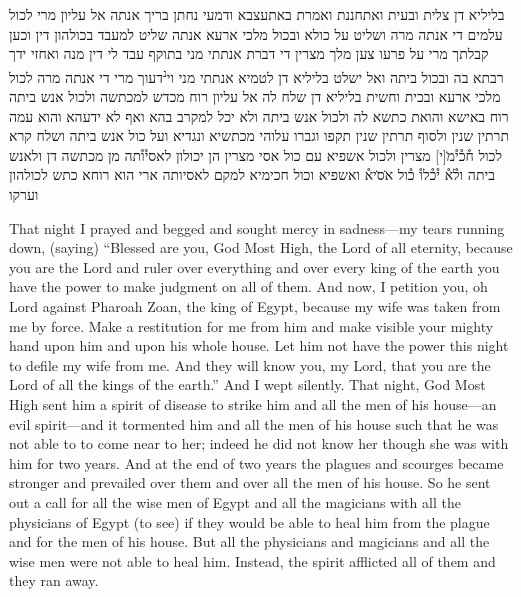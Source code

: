 \begin{aramaictext}
    בליליא דן צלית ובעית ואתחננת ואמרת באתעצבא ודמעי נחתן בריך אנתה
    אל עליון מרי לכול
    עלמים די אנתה מרה ושליט על כולא ובכול מלכי ארעא אנתה שליט
    למעבד בכולהון דין וכען
    קבלתך מרי על פרעו צען מלך מצרין די דברת אנתתי מני בתוקף עבד לי
    דין מנה ואחזי ידך רבתא
    בה ובכול ביתה ואל ישלט בליליא דן לטמיא אנתתי מני וי\textsuperscript{נ}דעוך מרי די
    אנתה מרה לכול מלכי
    ארעא ובכית וחשית בליליא דן שלח לה אל עליון רוח מכדש למכתשה
    ולכול אנש ביתה רוח
    באישא והואת כתשא לה ולכול אנש ביתה ולא יכל למקרב בהא ואף לא
    ידעהא והוא עמה
    תרתין שנין ולסוף תרתין שנין תקפו וגברו עלוהי מכתשיא ונגדיא ועל כול
    אנש ביתה ושלח
    קרא לכול ח֯כ֯י֯מ̇[י] מצרין ולכול אשפיא עם כול אסי מצרין הן יכולון
    לאסי֯ו֯תה מן מכתשה דן ולאנש
    ביתה ול֯א֯ י֯כ֯לו֯ כ֯ול א̇ס̇יא֯ ואשפיא וכול חכימיא למקם לאסיותה ארי הוא
    רוחא כתש לכולהון
    וערקו \vacat
\end{aramaictext}
\begin{translation}
    That night I prayed and begged and sought mercy in sadness---my tears running down, (saying) ``Blessed are you, God Most High, the Lord of all
    eternity, because you are the Lord and ruler over everything and over every king of the earth you have the power to make judgment on all of them. And now,
    I petition you, oh Lord against Pharoah Zoan, the king of Egypt, because my wife was taken from me by force. Make a restitution for me from him and make visible your mighty hand 
    upon him and upon his whole house. Let him not have the power this night to defile my wife from me. And they will know you, my Lord, that you are the Lord of all the kings of
    the earth.'' And I wept silently. That night, God Most High sent him a spirit of disease to strike him and all the men of his house---an evil
    spirit---and it tormented him and all the men of his house such that he was not able to to come near to her; indeed he did not know her though she was with him 
    for two years. And at the end of two years the plagues and scourges became stronger and prevailed over them and over all the men of his house. So he sent out 
    a call for all the wise men of Egypt and all the magicians with all the physicians of Egypt (to see) if they would be able to heal him from the plague and for the men of 
    his house. But all the physicians and magicians and all the wise men were not able to heal him.  Instead, the spirit afflicted all of them
    and they ran away.
\end{translation}

